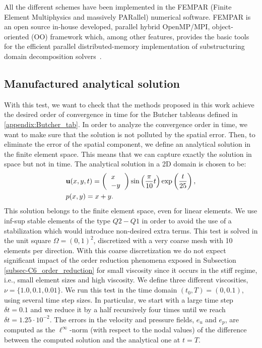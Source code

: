 All the different schemes have been implemented in the FEMPAR (Finite Element Multiphysics and massively PARallel)  numerical software. FEMPAR is an open source in-house developed, parallel hybrid OpenMP/MPI, object-oriented (OO) framework which, among other features, provides the basic tools for the efficient  parallel distributed-memory implementation  of substructuring domain decomposition solvers~\cite{badia_implementation_2013,art003}.

\subsection{Manufactured analytical solution}
\label{subsec-C6_manufactured}

With this test, we want to check that the methods proposed in this work achieve the desired order of convergence in time for the Butcher tableaus defined in \ref{appendix:Butcher_tab}. In order to analyze the convergence order in time, we want to make sure that the solution is not polluted by the spatial error. Then, to eliminate the error of the spatial component, we define an analytical solution in the finite element space. This means that we can capture exactly the solution in space but not in time. The analytical solution in a 2D domain is chosen to be:
\begin{align}
\label{eq-C6_analytical_u}
&\u(x,y,t) = \left( \begin{tabular}{l}
$x$\\
$-y$
\end{tabular}\right)\sin\left(\frac{\pi}{10}t\right)\exp\left(\frac{t}{25}\right),\\
\label{eq-C6_analytical_p}
&p(x,y) = x+y.
\end{align}
This solution belongs to the finite element space, even for linear elements. We use inf-sup stable elements of the type $Q2-Q1$ in order to avoid the use of a stabilization which would introduce non-desired extra terms.  This test is solved in the unit square $\Omega=(0,1)^2$, discretized with a very coarse mesh with 10 elements per direction. With this coarse discretization we do not expect significant impact of the order reduction phenomena exposed in Subsection \ref{subsec-C6_order_reduction} for small viscosity since it occurs in the stiff regime, i.e.,  small element sizes and high viscosity. We define three different viscosities, $\nu=\{1.0,0.1,0.01\}$. We run this test in the time domain $(t_0,T) = (0,0.1)$, using several time step sizes. In particular, we start with a large time step $\delta t=0.1$ and we reduce it by a half recursively four times until we reach $\delta t=1.25\cdot10^{-2}$. The errors in the velocity and pressure fields, $e_u$ and $e_p$, are computed as the $\ell^\infty$-norm (with respect to the nodal values) of the difference between the computed solution and the analytical one at $t=T$. %
